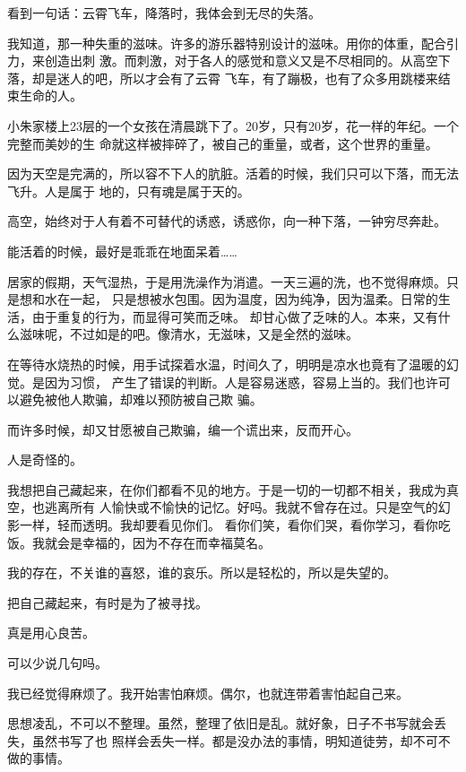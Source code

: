		看到一句话：云霄飞车，降落时，我体会到无尽的失落。

		我知道，那一种失重的滋味。许多的游乐器特别设计的滋味。用你的体重，配合引力，来创造出刺
	激。而刺激，对于各人的感觉和意义又是不尽相同的。从高空下落，却是迷人的吧，所以才会有了云霄
	飞车，有了蹦极，也有了众多用跳楼来结束生命的人。

		小朱家楼上23层的一个女孩在清晨跳下了。20岁，只有20岁，花一样的年纪。一个完整而美妙的生
	命就这样被摔碎了，被自己的重量，或者，这个世界的重量。

		因为天空是完满的，所以容不下人的肮脏。活着的时候，我们只可以下落，而无法飞升。人是属于
	地的，只有魂是属于天的。

		高空，始终对于人有着不可替代的诱惑，诱惑你，向一种下落，一钟穷尽奔赴。

		能活着的时候，最好是乖乖在地面呆着……



		居家的假期，天气湿热，于是用洗澡作为消遣。一天三遍的洗，也不觉得麻烦。只是想和水在一起，
	只是想被水包围。因为温度，因为纯净，因为温柔。日常的生活，由于重复的行为，而显得可笑而乏味。
	却甘心做了乏味的人。本来，又有什么滋味呢，不过如是的吧。像清水，无滋味，又是全然的滋味。

		在等待水烧热的时候，用手试探着水温，时间久了，明明是凉水也竟有了温暖的幻觉。是因为习惯，
	产生了错误的判断。人是容易迷惑，容易上当的。我们也许可以避免被他人欺骗，却难以预防被自己欺
	骗。

		而许多时候，却又甘愿被自己欺骗，编一个谎出来，反而开心。

		人是奇怪的。



		我想把自己藏起来，在你们都看不见的地方。于是一切的一切都不相关，我成为真空，也逃离所有
	人愉快或不愉快的记忆。好吗。我就不曾存在过。只是空气的幻影一样，轻而透明。我却要看见你们。
	看你们笑，看你们哭，看你学习，看你吃饭。我就会是幸福的，因为不存在而幸福莫名。

		我的存在，不关谁的喜怒，谁的哀乐。所以是轻松的，所以是失望的。

		把自己藏起来，有时是为了被寻找。

		真是用心良苦。



		可以少说几句吗。

		我已经觉得麻烦了。我开始害怕麻烦。偶尔，也就连带着害怕起自己来。

		思想凌乱，不可以不整理。虽然，整理了依旧是乱。就好象，日子不书写就会丢失，虽然书写了也
	照样会丢失一样。都是没办法的事情，明知道徒劳，却不可不做的事情。

